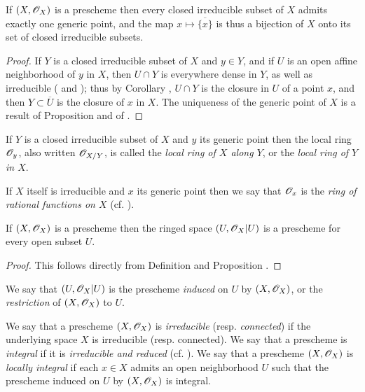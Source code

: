\begin{prop}[2.1.5]
\label{1.2.1.5}
If $(X,\mathscr{O}_X)$ is a prescheme then every closed
irreducible subset of $X$ admits exactly one generic point, and the map
$x\mapsto\overline{\{x\}}$ is thus a bijection of $X$ onto its set of closed
irreducible subsets.
\end{prop}

\begin{proof}
\label{proof-1.2.1.5}
If $Y$ is a closed irreducible subset of $X$ and $y\in Y$, and if $U$
is an open affine neighborhood of $y$ in $X$, then $U\cap Y$ is everywhere
dense in $Y$, as well as irreducible ( and ); thus by
Corollary , $U\cap Y$ is the closure in $U$ of a point $x$, and then
$Y\subset\overline{U}$ is the closure of $x$ in $X$. The uniqueness of the
generic point of $X$ is a result of Proposition  and of .
\end{proof}

\begin{env}[2.1.6]
\label{1.2.1.6}
If $Y$ is a closed irreducible subset of $X$ and $y$ its
generic point then the local ring $\mathscr{O}_y$, also written $\mathscr{O}_{X/Y}$, is called the
{\em local ring of $X$ along $Y$}, or the {\em local ring of $Y$ in $X$}.

If $X$ itself is irreducible and $x$ its generic point then we say that
$\mathscr{O}_x$ is the {\em ring of rational functions on $X$} (cf. ).
\end{env}

\begin{prop}[2.1.7]
\label{1.2.1.7}
If $(X,\mathscr{O}_X)$ is a prescheme then the ringed
space $(U,\mathscr{O}_X|U)$ is a prescheme for every open subset $U$.
\end{prop}

\begin{proof}
\label{proof-1.2.1.7}
This follows directly from Definition  and Proposition .
\end{proof}

We say that $(U,\mathscr{O}_X|U)$ is the prescheme {\em induced} on $U$ by
$(X,\mathscr{O}_X)$, or the {\em restriction} of $(X,\mathscr{O}_X)$ to $U$.

\begin{env}[2.1.8]
\label{1.2.1.8}
We say that a prescheme $(X,\mathscr{O}_X)$ is {\em irreducible}
(resp. {\em connected}) if the underlying space $X$ is irreducible (resp.
connected). We say that a prescheme is {\em integral} if it is
{\em irreducible and reduced} (cf. ). We say that a prescheme
$(X,\mathscr{O}_X)$ is {\em locally integral} if each $x\in X$ admits an open
neighborhood $U$ such that the prescheme induced on $U$ by $(X,\mathscr{O}_X)$ is integral.
\end{env}

